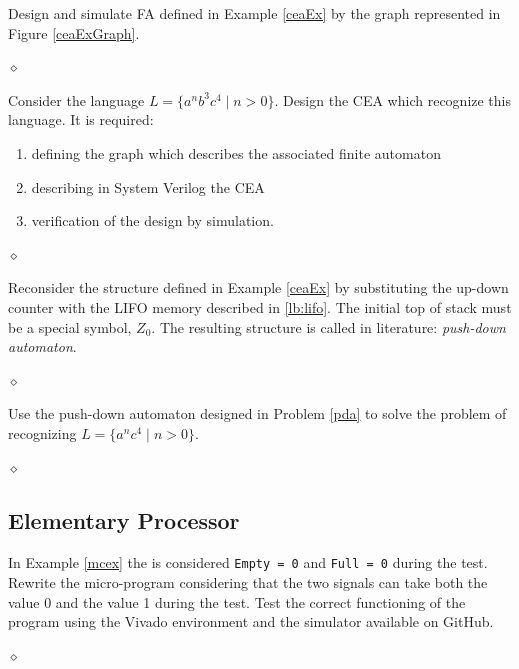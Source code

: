 \begin{problem}
Design and simulate FA defined in Example \ref{ceaEx} by the graph represented in Figure \ref{ceaExGraph}.

$\diamond$
\end{problem}

\begin{problem}
Consider the language $L = \{a^nb^3c^4 \;| \; n>0\}$. Design the CEA which recognize this language. It is required:
\begin{enumerate}
    \item defining the graph which describes the associated finite automaton
    \item describing in System Verilog the CEA 
    \item verification of the design by simulation.
\end{enumerate}

$\diamond$
\end{problem}

\begin{problem}\label{pda}
Reconsider the structure defined in Example \ref{ceaEx} by substituting the up-down counter with the LIFO memory described in \ref{lb:lifo}. The initial top of stack must be a special symbol, $Z_0$. The resulting structure is called in literature: {\em push-down automaton}.

$\diamond$
\end{problem}


\begin{problem}
Use the push-down automaton designed in Problem \ref{pda} to solve the problem of recognizing $L = \{a^nc^4 \;| \; n>0\}$.

$\diamond$
\end{problem}

\subsection{Elementary Processor}

\begin{problem}
In Example \ref{mcex} the is considered {\tt Empty = 0} and {\tt Full = 0} during the test. Rewrite the micro-program considering that the two signals can take both the value 0 and the value 1 during the test. Test the correct functioning of the program using the Vivado environment and the simulator available on GitHub.

$\diamond$
\end{problem}


